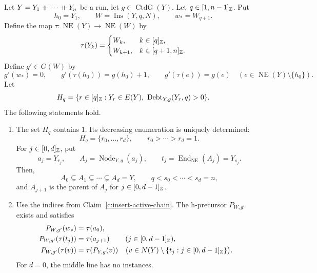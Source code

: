 \begin{lemma}\label{lem:insert-precursor-chain}
Let $Y=Y_1\mathbin{+\mkern-10mu+}\cdots\mathbin{+\mkern-10mu+} Y_n$ be a run, let $g\in\operatorname{CtdG}(Y)$. Let $q\in[1,n-1]_{\mathbb Z}$. Put
\[
 h_0=Y_1,\qquad W=\operatorname{Ins}(Y,q,N),\qquad w_*=W_{q+1}.
\]
Define the map $\tau:\operatorname{NE}(Y)\to\operatorname{NE}(W)$ by
\[
 \tau(Y_k)=
 \begin{cases}
 W_k,&k\in[q]_{\mathbb Z},\\
 W_{k+1},&k\in[q+1,n]_{\mathbb Z}.
 \end{cases}
\]
Define $g'\in G(W)$ by
\begin{equation}\label{eq:insertion-grading}
 g'(w_*)=0,\qquad
 g'(\tau(h_0))=g(h_0)+1,\qquad
 g'(\tau(e))=g(e)\quad(e\in\operatorname{NE}(Y)\setminus\{h_0\}).
\end{equation}
Let
\[
 H_q=\{r\in[q]_{\mathbb Z}:Y_r\in E(Y),\
          \operatorname{Debt}_{Y,g}(Y_r,q)>0\}.
\]
The following statements hold.

\begin{enumerate}
\item\label{c:insert-active-chain} The set $H_q$ contains $1$. Its decreasing enumeration is uniquely determined:
\[
H_q=\{r_0,\ldots,r_d\},\qquad r_0>\cdots>r_d=1.
\]
For $j\in[0,d]_{\mathbb Z}$, put
\[
a_j=Y_{r_j},\qquad A_j=\operatorname{Node}_{Y,g}(a_j),\qquad
t_j=\operatorname{End}_{\mathrm{NE}}(A_j)=Y_{s_j}.
\]
Then, \begin{equation}\label{eq:insertion-node-chain}
A_0\subsetneq A_1\subsetneq\cdots\subsetneq A_d=Y,\qquad
q<s_0<\cdots<s_d=n,
\end{equation}
and $A_{j+1}$ is the parent of $A_j$ for $j\in[0,d-1]_{\mathbb Z}$.

\item\label{c:insert-chain-precursor} Use the indices from Claim~\ref{c:insert-active-chain}. The h-precursor $P_{W,g'}$ exists and satisfies
\begin{equation}\label{eq:insertion-chain-map}
\begin{aligned}
P_{W,g'}(w_*)&=\tau(a_0),\\
P_{W,g'}(\tau(t_j))&=\tau(a_{j+1})
   &&(j\in[0,d-1]_{\mathbb Z}),\\
P_{W,g'}(\tau(v))&=\tau(P_{Y,g}(v))
   &&\bigl(v\in N(Y)\setminus\{t_j:j\in[0,d-1]_{\mathbb Z}\}\bigr).
\end{aligned}
\end{equation}
For $d=0$, the middle line has no instances.


\end{enumerate}
\end{lemma}
